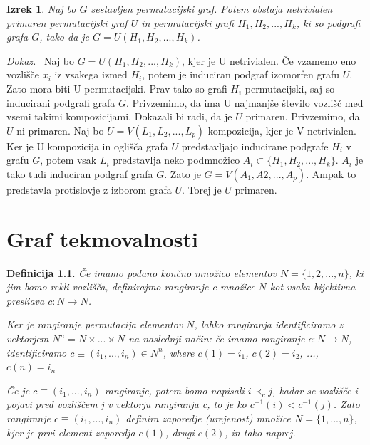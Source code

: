 \documentclass[a4paper, 12pt]{book}
\newtheorem{definicija}{Definicija}[chapter]
\newtheorem{izrek}{Izrek}[chapter]
\newenvironment{dokaz}{\emph{Dokaz.}\ }{\hspace{\fill}{$\Box$}}
\begin{document}
\begin{izrek}
    Naj bo $G$ sestavljen permutacijski graf. Potem obstaja netrivialen primaren permutacijski graf $U$ in permutacijski grafi $H_1, H_2, ..., H_k$, ki so podgrafi grafa $G$, tako da je $G = U(H_1, H_2, ..., H_k)$.
\end{izrek}
\begin{dokaz}
    Naj bo $G = U(H_1, H_2, ..., H_k)$, kjer je U netrivialen. Če vzamemo eno vozlišče $x_i$ iz vsakega izmed $H_i$, potem je induciran podgraf izomorfen grafu $U$. Zato mora biti U permutacijski. Prav tako so grafi $H_i$ permutacijski, saj so inducirani podgrafi grafa $G$. Privzemimo, da ima U najmanjše število vozlišč med vsemi takimi kompozicijami. Dokazali bi radi, da je $U$ primaren. Privzemimo, da $U$ ni primaren. Naj bo $U = V(L_1, L_2, ..., L_p)$ kompozicija, kjer je V netrivialen. Ker je U kompozicija in oglišča grafa $U$ predstavljajo inducirane podgrafe $H_i$ v grafu $G$, potem vsak $L_i$ predstavlja neko podmnožico $A_i \subset \{ H_1, H_2, ..., H_k \}$. $A_i$ je tako tudi induciran podgraf grafa $G$. Zato je $G = V(A_1, A2, ..., A_p)$. Ampak to predstavla protislovje z izborom grafa $U$. Torej je $U$ primaren.
\end{dokaz}

\chapter{ Graf tekmovalnosti }

\begin{definicija}
    Če imamo podano končno množico elementov $N = \{ 1, 2, ..., n \}$, ki jim bomo rekli vozlišča, definirajmo rangiranje c množice $N$ kot vsaka bijektivna presliava $c: N \rightarrow N$.

    Ker je rangiranje permutacija elementov $N$, lahko rangiranja identificiramo z vektorjem $N^n = N \times ... \times N$ na naslednji način: če imamo rangiranje $c: N \rightarrow N$, identificiramo $c \equiv (i_1, ..., i_n) \in N^n$, where $c(1) = i_1$, $c(2) = i_2$, ..., $c(n) = i_n$
    
    Če je $c \equiv (i_1, ..., i_n)$ rangiranje, potem bomo napisali $i \prec_c j$, kadar se vozlišče i pojavi pred vozliščem j v vektorju rangiranja c, to je ko $c^{-1}(i) < c^{-1}(j)$. Zato rangiranje $c \equiv (i_1, ..., i_n)$ definira zaporedje (urejenost) množice $N = \{ 1, ..., n\}$, kjer je prvi element zaporedja $c(1)$, drugi $c(2)$, in tako naprej.
\end{definicija}
\end{document}
